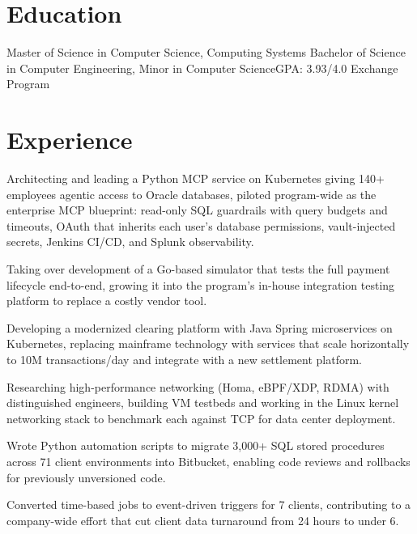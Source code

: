 \documentclass{resume}
\begin{document}

\section{Education}
  {Master of Science in Computer Science, Computing Systems}{}
  {Bachelor of Science in Computer Engineering, Minor in Computer Science}{GPA: 3.93/4.0}
  {Exchange Program}{}

\section{Experience}
\begin{bullets}
  \item Architecting and leading a Python MCP service on Kubernetes giving 140+ employees agentic access to Oracle databases, piloted program-wide as the enterprise MCP blueprint: read-only SQL guardrails with query budgets and timeouts, OAuth that inherits each user's database permissions, vault-injected secrets, Jenkins CI/CD, and Splunk observability.
  \item Taking over development of a Go-based simulator that tests the full payment lifecycle end-to-end, growing it into the program's in-house integration testing platform to replace a costly vendor tool.
  \item Developing a modernized clearing platform with Java Spring microservices on Kubernetes, replacing mainframe technology with services that scale horizontally to 10M transactions/day and integrate with a new settlement platform.
  \item Researching high-performance networking (Homa, eBPF/XDP, RDMA) with distinguished engineers, building VM testbeds and working in the Linux kernel networking stack to benchmark each against TCP for data center deployment.
\end{bullets}
\begin{bullets}
  \item Wrote Python automation scripts to migrate 3,000+ SQL stored procedures across 71 client environments into Bitbucket, enabling code reviews and rollbacks for previously unversioned code.
  \item Converted time-based jobs to event-driven triggers for 7 clients, contributing to a company-wide effort that cut client data turnaround from 24 hours to under 6.
\end{bullets}
\end{document}
